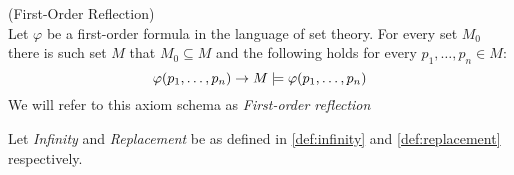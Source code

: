 \begin{definition}{(First-Order Reflection)}\label{def:first_order_reflection}\\ %
Let $\varphi$ be a first-order formula in the language of set theory.
For every set $M_0$ there is such set $M$ that $M_0 \subseteq M$ and the following holds for every $p_1, \ldots, p_n \in M$:
\begin{equation}
\varphi(p_1, \ldots, p_n) \rightarrow M \models \varphi(p_1, \ldots, p_n)
\end{equation}
We will refer to this axiom schema as \emph{First-order reflection}
\end{definition}


Let \emph{Infinity} and \emph{Replacement} be as defined in \ref{def:infinity} and \ref{def:replacement} respectively.

